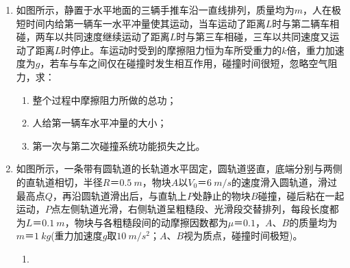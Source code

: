 \begin{enumerate}[leftmargin=0em]
{\begin{enumerate}
\end{enumerate}


}


\newpage	
\item 
{}
如图所示，静置于水平地面的三辆手推车沿一直线排列，质量均为$ m $，人在极短时间内给第一辆车一水平冲量使其运动，当车运动了距离$ L $时与第二辆车相碰，两车以共同速度继续运动了距离$ L $时与第三车相碰，三车以共同速度又运动了距离$ L $时停止。车运动时受到的摩擦阻力恒为车所受重力的$ k $倍，重力加速度为$ g $，若车与车之间仅在碰撞时发生相互作用，碰撞时间很短，忽略空气阻力，求：
\begin{enumerate}
\renewcommand{\labelenumi}{\arabic{enumi}.}
\item
整个过程中摩擦阻力所做的总功；
\item 
人给第一辆车水平冲量的大小；
\item 
第一次与第二次碰撞系统功能损失之比。
\end{enumerate}
\begin{figure}[h!]
\flushright

\end{figure}





\item 
{}
如图所示，一条带有圆轨道的长轨道水平固定，圆轨道竖直，底端分别与两侧的直轨道相切，半径$ R＝ 0.5\ m $，物块$ A $以$ V_{0} $＝$ 6 \ m/s $的速度滑入圆轨道，滑过最高点$ Q $，再沿圆轨道滑出后，与直轨上$ P $处静止的物块$ B $碰撞，碰后粘在一起运动，$ P $点左侧轨道光滑，右侧轨道呈粗糙段、光滑段交替排列，每段长度都为$ L $＝$ 0.1\ m $，物块与各粗糙段间的动摩擦因数都为$ \mu ＝0.1 $，$ A $、$ B $的质量均为$ m ＝1 \ kg $(重力加速度$ g $取$ 10 \ m/s^{2} $；$ A $、$ B $视为质点，碰撞时间极短)。
\begin{enumerate}
\renewcommand{\labelenumii}{(\arabic{enumii})}
\item 


\end{enumerate}
\end{enumerate}
